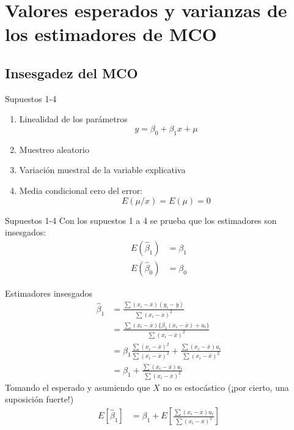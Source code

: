 \section{Valores esperados y varianzas de los estimadores de MCO}

\subsection{Insesgadez del MCO}
\begin{frame}{Supuestos 1-4}
	\begin{enumerate}
		\item Linealidad de los parámetros
		$$y=\beta_{0}+\beta_{1}x+\mu$$
		\item Muestreo aleatorio
		\item Variación muestral de la variable explicativa
		\item Media condicional cero del error:
		$$E(\mu / x) = E(\mu) = 0$$
	\end{enumerate}
\end{frame}
\begin{frame}{Supuestos 1-4}
	Con los supuestos 1 a 4 se prueba que los estimadores son insesgados:
	\begin{align*}
		E(\hat{\beta}_{1}) &= \beta_{1}\\
		E(\hat{\beta}_{0}) &= \beta_{0}
	\end{align*}
\end{frame}
\begin{frame}{Estimadores insesgados}
	\begin{align*}
		\widehat{\beta}_1 &= \frac{\sum (x_{i}-\overline{x})(y_{i}-\overline{y})}{\sum (x_{i}-\overline{x})^2}\\
		& = \frac{\sum (x_{i}-\overline{x})\{\beta_1(x_{i}-\overline{x})+u_i\}}{\sum (x_{i}-\overline{x})^2}\\
		& = \beta_1\frac{\sum (x_{i}-\overline{x})^2}{\sum (x_{i}-\overline{x})^2} + \frac{\sum (x_{i}-\overline{x})u_i}{\sum (x_{i}-\overline{x})^2}\\
		& = \beta_1 + \frac{\sum (x_{i}-\overline{x})u_i}{\sum (x_{i}-\overline{x})^2} \tag{2}
	\end{align*}
	Tomando el esperado y asumiendo que $X$ no es estocástico (¡por cierto, una suposición fuerte!)
	\begin{align*}
		E[\widehat{\beta}_1] & = \beta_1 + E\left[\frac{\sum (x_{i}-\overline{x})u_i}{\sum (x_{i}-\overline{x})^2} \right]
	\end{align*}
\end{frame}
